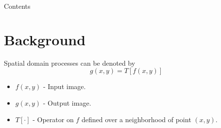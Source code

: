 


\subtitle{Intensity Transformation}





\begin{frame}
\titlepage %
\end{frame}


\begin{frame}{Contents}
\setcounter{tocdepth}{1}
\tableofcontents
\end{frame}


\section{Background}

%


\begin{frame}
Spatial domain processes can be denoted by
\begin{equation}
g(x,y) = T\left [f(x,y)\right ]
\end{equation}
\begin{itemize}
\item $f(x,y)$ - Input image.
\item $g(x,y)$ - Output image.
\item $T[\cdot]$ - Operator on $f$ defined over a neighborhood of point $(x,y)$.
\end{itemize}
\end{frame}

